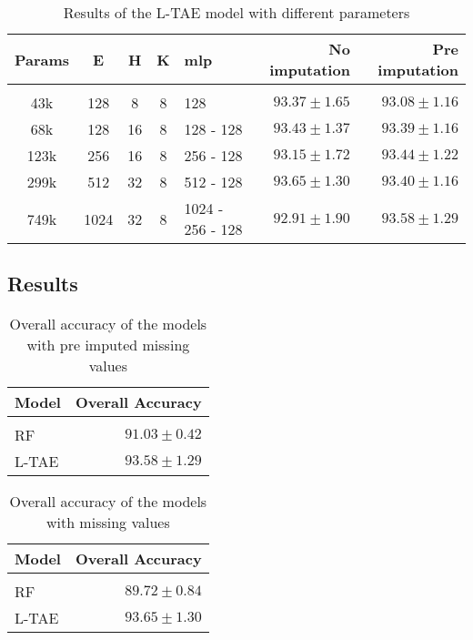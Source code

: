 \begin{table}[ht]
  \centering
  \begin{tabular}{cccclrr} 
     Params & E & H & K & mlp & No imputation & Pre imputation\\[0.2cm] 
     \hline \\[-0.2cm] 
     43k & 	128 & 	8 & 	8 & 	128 & 	$93.37 \pm 1.65$ & 	$93.08 \pm 1.16$\\ 
     68k & 	128 & 	16 & 	8 & 	128 - 128 & 	$93.43 \pm 1.37$ & 	$93.39 \pm 1.16$\\ 
     123k & 	256 & 	16 & 	8 & 	256 - 128 & 	$93.15 \pm 1.72$ & 	$93.44 \pm 1.22$\\ 
     299k & 	512 & 	32 & 	8 & 	512 - 128 & 	$\mathbf{93.65 \pm 1.30}$ & 	$93.40 \pm 1.16$\\ 
     749k & 	1024 & 	32 & 	8 & 	1024 - 256 - 128 & 	$92.91 \pm 1.90$ & 	$\mathbf{93.58 \pm 1.29}$\\ 
  \end{tabular}
  \caption{Results of the L-TAE model with different parameters}
  \label{tab:LTAEresults}
\end{table}
\pagebreak

\subsection{Results}

\begin{table}[!htbp]
  \centering
    \begin{tabular}{lr}
    Model                       & Overall Accuracy             \\[0.2cm] 
    \hline \\[-0.2cm]
    RF      & $91.03 \pm 0.42$\\
    L-TAE   & $93.58 \pm 1.29$
    \end{tabular}
  \caption{Overall accuracy of the models with pre imputed missing values} 
\end{table}

\begin{table}[!htbp]
  \centering
    \begin{tabular}{lr}
    Model                       & Overall Accuracy             \\[0.2cm] 
    \hline \\[-0.2cm]
    RF      & $89.72 \pm 0.84$\\
    L-TAE   & $93.65 \pm 1.30$
    \end{tabular}
  \caption{Overall accuracy of the models with missing values} 
\end{table}
